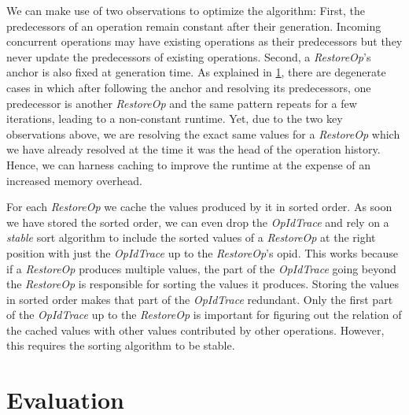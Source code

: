 \documentclass[sigplan,natbib=false,review]{acmart}
\newcommand{\restopkind}{\textit{RestoreOp}}
\newcommand{\opidtrace}{\textit{OpIdTrace}}
\begin{document}
We can make use of two observations to optimize the algorithm:
First, the predecessors of an operation remain constant after their generation.
Incoming concurrent operations may have existing operations as their predecessors
but they never update the predecessors of existing operations.
Second, a \restopkind{}'s anchor is also fixed at generation time.
As explained in \cref{sec:evaluation}, there are degenerate cases in which after
following the anchor and resolving its predecessors, one predecessor is another
\restopkind{} and the same pattern repeats for a few iterations,
leading to a non-constant runtime.
Yet, due to the two key observations above, we are resolving the exact same values
for a \restopkind{} which we have already resolved at the time it was the head of
the operation history.
Hence, we can harness caching to improve the runtime at the expense of an
increased memory overhead.

For each \restopkind{} we cache the values produced by it in sorted order.
As soon we have stored the sorted order, we can even drop the \opidtrace{} and rely
on a \emph{stable} sort algorithm to include the sorted values of a \restopkind{}
at the right position with just the \opidtrace{} up to the \restopkind{}'s \gls*{opid}.
This works because if a \restopkind{} produces multiple values, the part of the \opidtrace{}
going beyond the \restopkind{} is responsible for sorting the values it produces.
Storing the values in sorted order makes that part of the \opidtrace{} redundant.
Only the first part of the \opidtrace{} up to the \restopkind{} is important for figuring
out the relation of the cached values with other values contributed by other operations.
However, this requires the sorting algorithm to be stable.

\section{Evaluation}\label{sec:evaluation}

\end{document}
